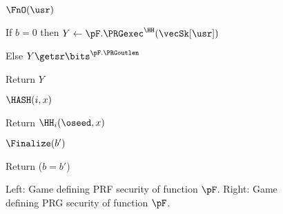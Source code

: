 \begin{figure}
{		\begin{oracle}{$\FnO(\usr)$}
			\item If $b = 0$ then $Y \gets \pF.\PRGexec^{\HH}(\vecSk[\usr])$
			\item Else $Y \getsr \bits^{\pF.\PRGoutlen}$
			\item Return $Y$
		\end{oracle}
		\ExptSepSpace
		\begin{oracle}{$\HASH(i, x)$}
			\item Return $\HH_i(\oseed,x)$
		\end{oracle}
		\ExptSepSpace
		
		\begin{oracle}{$\Finalize(b')$}
			\item Return ($b=b'$) \vspace{2pt}
		\end{oracle}
	}
\vspace{-5pt}
\caption{Left: Game defining PRF security of function $\pF$. Right: Game defining PRG security of function $\pF$. }
\label{fig:PRF-PRG}
\hrulefill
\vspace{-10pt}
\end{figure}

